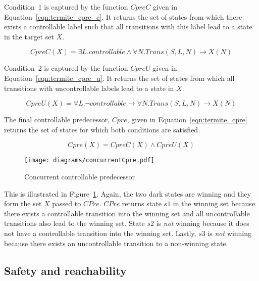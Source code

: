 Condition~1 is captured by the function $CpreC$ given in Equation~\ref{eqn:termite_cpre_c}. It returns the set of states from which there exists a controllable label such that all transitions with this label lead to a state in the target set $X$.

\begin{equation}
    CpreC(X) =  \exists L. controllable \land \forall N. Trans(S, L, N) \rightarrow X(N)
    \label{eqn:termite_cpre_c}
\end{equation}

Condition~2 is captured by the function $CpreU$ given in Equation~\ref{eqn:termite_cpre_u}. It returns the set of states from which all transitions with uncontrollable labels lead to a state in $X$.

\begin{equation}
    CpreU(X) =  \forall L. \neg controllable \rightarrow \forall N. Trans(S, L, N) \rightarrow X(N)
    \label{eqn:termite_cpre_u}
\end{equation}

The final controllable predecessor, $Cpre$, given in Equation~\ref{eqn:termite_cpre} returns the set of states for which both conditions are satisfied.

\begin{equation}
    Cpre(X) =  CpreC(X) \land CpreU(X)
    \label{eqn:termite_cpre}
\end{equation}

\begin{figure}[t]
\centering
\texttt{[image: diagrams/concurrentCpre.pdf]}
\caption{Concurrent controllable predecessor}
\label{fig:concurrent_cpre}
\end{figure}

This is illustrated in Figure~\ref{fig:concurrent_cpre}. Again, the two dark states are winning and they form the set $X$ passed to $CPre$. $CPre$ returns state $s1$ in the winning set because there exists a controllable transition into the winning set and all uncontrollable transitions also lead to the winning set. State $s2$ is \emph{not} winning because it does not have a controllable transition into the winning set. Lastly, $s3$ is \emph{not} winning because there exists an uncontrollable transition to a non-winning state.

\subsection{Safety and reachability}

